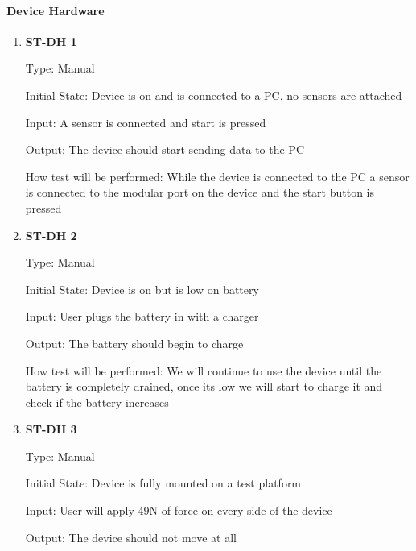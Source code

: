 \documentclass[12pt, titlepage]{article}
\begin{document}
  \paragraph{Device Hardware}	
  \begin{enumerate}
  
    \item{\bf{ST-DH 1}}
    
    Type: Manual
              
    Initial State: Device is on and is connected to a PC, no sensors are attached
              
    Input: A sensor is connected and start is pressed
              
    Output: The device should start sending data to the PC
    
              
    How test will be performed: While the device is connected to the PC a sensor is connected to the modular port on the device and the start button is pressed\\
  
    \item{\bf{ST-DH 2}}
    
    Type: Manual
              
    Initial State: Device is on but is low on battery
              
    Input: User plugs the battery in with a charger
              
    Output: The battery should begin to charge
    
              
    How test will be performed: We will continue to use the device until the battery is completely drained, once its low we will start to charge it and check if the battery increases\\

    \item{\bf{ST-DH 3}}
    
    Type: Manual
              
    Initial State: Device is fully mounted on a test platform
              
    Input: User will apply 49N of force on every side of the device
              
    Output: The device should not move at all
    
              

\end{enumerate}
\end{document}
